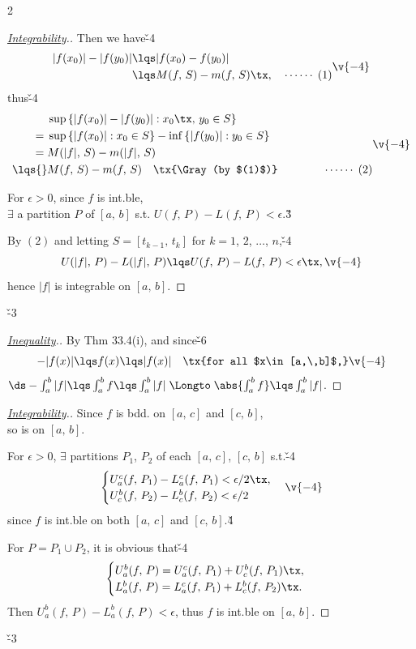 \documentclass[dvipdfmx,a4paper,titlepage,9pt]{jsarticle}
\begin{document}
\begin{multicols*}{2}
\begin{pfbox}
\begin{proof}[\color{TGreen}\ul{Integrability}.]
Then we have\v{-4}
$$\begin{aligned}
|f(x_0)|-|f(y_0)|&\lqs |f(x_0)-f(y_0)|\\
&\lqs M(f,\,S)-m(f,\,S)\tx,\quad\cdots\cdots\;(1)
\end{aligned}\v{-4}$$
thus\v{-4}
$$\begin{aligned}
&\sup{}\{|f(x_0)|-|f(y_0)|:x_0\tx,\,y_0\in S\}\\
={}&\sup{}\{|f(x_0)|:x_0\in S\}-\inf{}\{|f(y_0)|:y_0\in S\}\\
={}&M(|f|,\,S)-m(|f|,\,S)\\
\lqs{}&M(f,\,S)-m(f,\,S)\quad\tx{\Gray(by $(1)$)}\qquad\qquad\cdots\cdots\;(2)
\end{aligned}\v{-4}$$

For $\epsilon>0$, since $f$ is int.ble,\\
$\exists$ a partition $P$ of $[a,\,b]$ s.t. $U(f,\,P)-L(f,\,P)<\epsilon$.\v3

By $(2)$ and letting $S=[t_{k-1},\,t_k]$ for $k=1$, $2$, $\ldots$, $n$,\v{-4}
$$U(|f|,\,P)-L(|f|,\,P)\lqs U(f,\,P)-L(f,\,P)<\epsilon\tx,\v{-4}$$
hence $|f|$ is integrable on $[a,\,b]$.
\end{proof}\v{-3}

\dotfill

\begin{proof}[\color{TGreen}\ul{Inequality}.]
By Thm 33.4(i), and since\v{-6}
$$-|f(x)|\lqs f(x)\lqs |f(x)|\quad\tx{for all $x\in[a,\,b]$,}\v{-4}$$
$\ds-\int_a^b|f|\lqs \int_a^bf\lqs\int_a^b|f|\;\Longto\;\abs{\int_a^bf}\lqs\int_a^b|f|$.
\end{proof}
\end{pfbox}

\;

\begin{pfbox}[($\int_a^bf=\int_a^cf+\int_c^bf$)]
\begin{proof}[\color{TGreen}\ul{Integrability}.]\rnc{\qedsymbol}{\Sq}Since $f$ is bdd. on $[a,\,c]$ and $[c,\,b]$,\\
so is on $[a,\,b]$.

For $\epsilon>0$, $\exists$ partitions $P_1$, $P_2$ of each $[a,\,c]$, $[c,\,b]$ s.t.\v{-4}
$$\begin{cases}
U_a^c(f,\,P_1)-L_a^c(f,\,P_1)<\epsilon/2\tx,\\
U_c^b(f,\,P_2)-L_c^b(f,\,P_2)<\epsilon/2
\end{cases}\v{-4}$$
since $f$ is int.ble on both $[a,\,c]$ and $[c,\,b]$.\v4

For $P=P_1\cup P_2$, it is obvious that\v{-4}
$$\begin{cases}
U_a^b(f,\,P)=U_a^c(f,\,P_1)+U_c^b(f,\,P_1)\tx,\\
L_a^b(f,\,P)=L_a^c(f,\,P_1)+L_c^b(f,\,P_2)\tx.
\end{cases}$$
Then $U_a^b(f,\,P)-L_a^b(f,\,P)<\epsilon$, thus $f$ is int.ble on $[a,\,b]$.
\end{proof}\v{-3}


\end{pfbox}
\end{multicols*}
\end{document}
